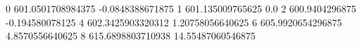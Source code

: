 0 601.0501708984375 -0.0848388671875
1 601.135009765625 0.0
2 600.9404296875 -0.194580078125
4 602.3425903320312 1.20758056640625
6 605.9920654296875 4.8570556640625
8 615.6898803710938 14.55487060546875
